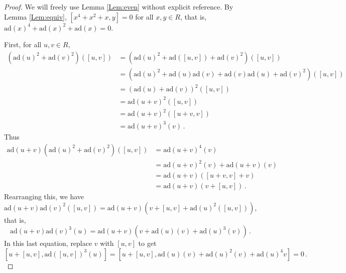 \documentclass[10pt,a4paper]{amsart}
\newcommand{\ad}[1]{\mathrm{ad}(#1)}
\begin{document}
\begin{proof}
	We will freely use Lemma \ref{Lem:even} without explicit reference.
	By Lemma \ref{Lem:equiv}, $[x^4 + x^2 + x,y] = 0$ for all $x,y\in R$, that is, $\ad{x}^4 + \ad{x}^2 + \ad{x} = 0$. 
	
	First, for all $u,v\in R$,
	\begin{align*}
		(\ad{u}^2 + \ad{v}^2)([u,v]) &= (\ad{u}^2 + \ad{[u,v]} + \ad{v}^2)([u,v]) \\
		&= (\ad{u}^2 + \ad{u}\ad{v} + \ad{v}\ad{u} + \ad{v}^2)([u,v]) \\
		&= (\ad{u} + \ad{v})^2 ([u,v]) \\
		&= \ad{u+v}^2([u,v]) \\
		&= \ad{u+v}^2([u+v,v]) \\
		&= \ad{u+v}^3(v)\,.
	\end{align*}
	Thus
	\begin{align*}
		\ad{u+v}(\ad{u}^2 + \ad{v}^2)([u,v]) &= \ad{u+v}^4(v) \\
		&= \ad{u+v}^2(v) + \ad{u+v}(v) \\
		&= \ad{u+v}([u+v,v] + v) \\
		&= \ad{u+v}(v + [u,v])\,.
	\end{align*}
	Rearranging this, we have $\ad{u+v}\ad{v}^2([u,v]) = \ad{u+v}(v + [u,v] + \ad{u}^2([u,v]))$, that is,
	\[
	\ad{u+v}\ad{v}^3(u) = \ad{u+v}(v + \ad{u}(v) + \ad{u}^3(v))\,.
	\]
	In this last equation, replace $v$ with $[u,v]$ to get
	\begin{equation}\label{Eqn:exp8-1}
		[u + [u,v], \ad{[u,v]}^3(u)] = [u + [u,v],\ad{u}(v) + \ad{u}^2(v) + \ad{u}^4{v}] = 0\,.
	\end{equation}
	

\end{proof}
\end{document}
